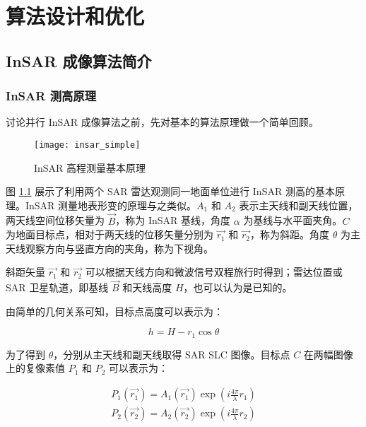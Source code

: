 \chapter{算法设计和优化}

\section{InSAR 成像算法简介}

\subsection{InSAR 测高原理}

讨论并行 InSAR 成像算法之前，先对基本的算法原理做一个简单回顾。

\begin{figure}[ht]
\centering
\texttt{[image: insar\_simple]}
\caption{InSAR 高程测量基本原理} \label{fig:insar_simple}
\end{figure}

图 \ref{fig:insar_simple} 展示了利用两个 SAR 雷达观测同一地面单位进行 InSAR 测高的基本原理。InSAR 测量地表形变的原理与之类似。$A_1$ 和 $A_2$ 表示主天线和副天线位置，两天线空间位移矢量为 $\vec{B}$，称为 InSAR 基线，角度 $\alpha$ 为基线与水平面夹角。$C$ 为地面目标点，相对于两天线的位移矢量分别为 $\vec{r_1}$ 和 $\vec{r_2}$，称为斜距。角度 $\theta$ 为主天线观察方向与竖直方向的夹角，称为下视角。

斜距矢量 $ \vec{r_1} $ 和 $ \vec{r_2} $ 可以根据天线方向和微波信号双程旅行时得到；雷达位置或 SAR 卫星轨道，即基线 $\vec{B}$ 和天线高度 $H$，也可以认为是已知的。

由简单的几何关系可知，目标点高度可以表示为：

\begin{equation}
    h = H - r_1 \cos\theta
\end{equation}

为了得到 $\theta$，分别从主天线和副天线取得 SAR SLC 图像。目标点 $C$ 在两幅图像上的复像素值 $P_1$ 和 $P_2$ 可以表示为：

\begin{equation}
\begin{split}
    P_1(\vec{r_1}) = A_1(\vec{r_1}) \exp(i \frac{4\pi}{\lambda} r_1) \\
    P_2(\vec{r_2}) = A_2(\vec{r_2}) \exp(i \frac{4\pi}{\lambda} r_2) \\
\end{split}
\end{equation}

